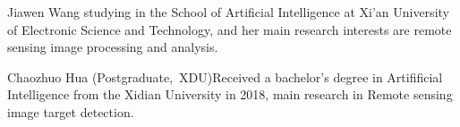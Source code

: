 \documentclass[journal]{IEEEtran}
\begin{document}
  \begin{IEEEbiography}{Jiawen Wang}
    studying in the School of Artificial Intelligence at Xi'an University of Electronic Science and Technology, and her main research interests are remote sensing image processing and analysis.
 \end{IEEEbiography}

 \begin{IEEEbiography}{Chaozhuo Hua}
(Postgraduate,~XDU)Received a bachelor's degree in Artifificial Intelligence from the Xidian University in 2018, main research in 
Remote sensing image target detection.
\end{IEEEbiography}
\end{document}
